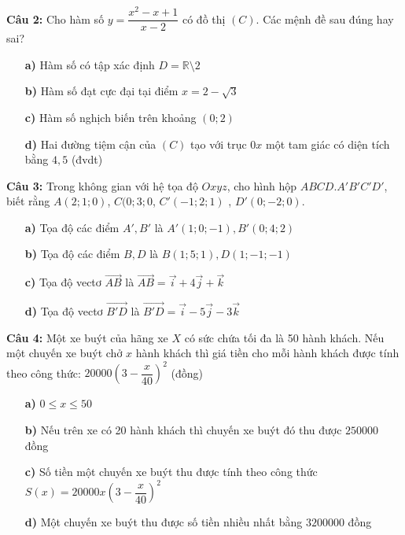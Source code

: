 \documentclass[12pt, a4paper]{article}
\begin{document}
\textbf{Câu 2: } Cho hàm số $ y = \dfrac{x^2 - x + 1}{x - 2} $ có đồ thị $(C)$. Các mệnh đề sau đúng hay sai?
\vspace{-0.5cm}
	\begin{enumerate}
		\item[\textbf{a)}] Hàm số có tập xác định $ D = \mathbb{R} \setminus 2 $
		\item[\textbf{b)}] Hàm số đạt cực đại tại điểm $ x = 2 - \sqrt{3} $
		\item[\textbf{c)}] Hàm số nghịch biến trên khoảng $ (0;2) $
		\item[\textbf{d)}] Hai đường tiệm cận của $(C)$ tạo với trục $0x$ một tam giác có diện tích bằng $4,5$ (đvdt)
	\end{enumerate}
	
\textbf{Câu 3: } Trong không gian với hệ tọa độ $ Oxyz $, cho hình hộp $ ABCD.A'B'C'D' $, biết rằng $ A(2;1;0) $, $ C(0;3;0 $, $ C'(-1;2;1) $ , $ D'(0;-2;0) $.
\vspace{-0.5cm}
	\begin{enumerate}
		\item[\textbf{a)}] Tọa độ các điểm $ A',B'$ là $ A'(1;0;-1), B'(0;4;2) $ 
		\item[\textbf{b)}] Tọa độ các điểm $ B, D $ là $ B(1;5;1), D(1;-1;-1)$
		\item[\textbf{c)}] Tọa độ vectơ $ \overrightarrow{AB} $ là $ \overrightarrow{AB} = \vec{i} + 4\vec{j} + \vec{k} $
		\item[\textbf{d)}] Tọa độ vectơ $ \overrightarrow{B'D} $ là $ \overrightarrow{B'D} = \vec{i} - 5\vec{j} - 3\vec{k} $
	\end{enumerate}
	
\textbf{Câu 4: } Một xe buýt của hãng xe $ X $ có sức chứa tối đa là 50 hành khách. Nếu một chuyến xe buýt chở $x$ hành khách thì giá tiền cho mỗi hành khách được tính theo công thức: $ 20 000 \left( 3 - \dfrac{x}{40} \right)^2 $ (đồng)
\vspace{-0.5cm}
	\begin{enumerate}
		\item[\textbf{a)}] $ 0 \leq x \leq 50 $
		\item[\textbf{b)}] Nếu trên xe có 20 hành khách thì chuyến xe buýt đó thu được $ 250000 $ đồng
		\item[\textbf{c)}] Số tiền một chuyến xe buýt thu được tính theo công thức $ S(x) = 20 000x \left( 3 - \dfrac{x}{40} \right)^2 $
		\item[\textbf{d)}] Một chuyến xe buýt thu được số tiền nhiều nhất bằng $3200000$ đồng
	\end{enumerate}
\end{document}
